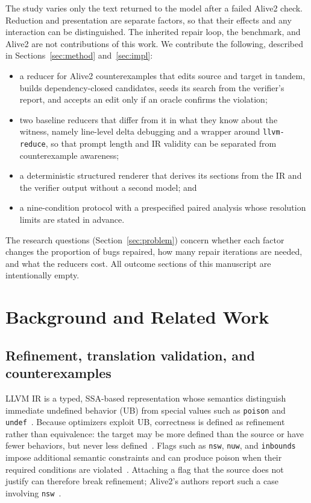 \documentclass[conference]{IEEEtran}
\begin{document}
The study varies only the text returned to the model after a failed Alive2 check. Reduction and presentation are separate factors, so that their effects and any interaction can be distinguished. The inherited repair loop, the benchmark, and Alive2 are not contributions of this work. We contribute the following, described in Sections~\ref{sec:method} and~\ref{sec:impl}:
\begin{itemize}
\item a reducer for Alive2 counterexamples that edits source and target in tandem, builds dependency-closed candidates, seeds its search from the verifier's report, and accepts an edit only if an oracle confirms the violation;
\item two baseline reducers that differ from it in what they know about the witness, namely line-level delta debugging and a wrapper around \texttt{llvm-reduce}, so that prompt length and IR validity can be separated from counterexample awareness;
\item a deterministic structured renderer that derives its sections from the IR and the verifier output without a second model; and
\item a nine-condition protocol with a prespecified paired analysis whose resolution limits are stated in advance.
\end{itemize}

The research questions (Section~\ref{sec:problem}) concern whether each factor changes the proportion of bugs repaired, how many repair iterations are needed, and what the reducers cost. All outcome sections of this manuscript are intentionally empty.

\section{Background and Related Work}

\subsection{Refinement, translation validation, and counterexamples}

LLVM IR is a typed, SSA-based representation whose semantics distinguish immediate undefined behavior (UB) from special values such as \texttt{poison} and \texttt{undef}~\cite{lopes2021alive2,llvmlangref}. Because optimizers exploit UB, correctness is defined as refinement rather than equivalence: the target may be more defined than the source or have fewer behaviors, but never less defined~\cite{lopes2021alive2}. Flags such as \texttt{nsw}, \texttt{nuw}, and \texttt{inbounds} impose additional semantic constraints and can produce poison when their required conditions are violated~\cite{llvmlangref}. Attaching a flag that the source does not justify can therefore break refinement; Alive2's authors report such a case involving \texttt{nsw}~\cite{lopes2021alive2}.
\end{document}
